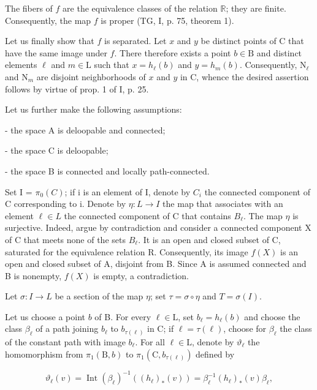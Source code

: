 The fibers of \(f\) are the equivalence classes of the relation \(\mathbb{R}\); they are finite. Consequently, the map \(f\) is proper (TG, I, p. 75, theorem 1).

Let us finally show that \(f\) is separated. Let \(x\) and \(y\) be distinct points of C that have the same image under \(f\). There therefore exists a point \(b \in \mathrm{B}\) and distinct elements \(\ell\) and \(m \in \mathrm{L}\) such that \(x = h_{\ell}(b)\) and \(y = h_{m}(b)\). Consequently, \(\mathrm{N}_{\ell}\) and \(\mathrm{N}_m\) are disjoint neighborhoods of \(x\) and \(y\) in C, whence the desired assertion follows by virtue of prop. 1 of I, p. 25.

Let us further make the following assumptions:

- the space A is deloopable and connected;

- the space C is deloopable;

- the space B is connected and locally path-connected.

Set I = \(\pi_{0}(C)\); if i is an element of I, denote by \(C_{i}\) the connected component of C corresponding to i. Denote by \(\eta: L \rightarrow I\) the map that associates with an element \(\ell \in L\) the connected component of C that contains \(B_{\ell}\). The map \(\eta\) is surjective. Indeed, argue by contradiction and consider a connected component X of C that meets none of the sets \(B_{\ell}\). It is an open and closed subset of C, saturated for the equivalence relation R. Consequently, its image \(f(X)\) is an open and closed subset of A, disjoint from B. Since A is assumed connected and B is nonempty, \(f(X)\) is empty, a contradiction.

Let \(\sigma\colon I\to L\) be a section of the map \(\eta\); set \(\tau=\sigma\circ\eta\) and \(T=\sigma(I)\).

Let us choose a point \(b\) of B. For every \(\ell \in \mathrm{L}\), set \(b_{\ell} = h_{\ell}(b)\) and choose the class \(\beta_{\ell}\) of a path joining \(b_{\ell}\) to \(b_{\tau(\ell)}\) in C; if \(\ell = \tau(\ell)\), choose for \(\beta_{\ell}\) the class of the constant path with image \(b_{\ell}\). For all \(\ell \in \mathrm{L}\), denote by \(\vartheta_{\ell}\) the homomorphism from \(\pi_1(\mathrm{B}, b)\) to \(\pi_1(\mathrm{C}, b_{\tau(\ell)})\) defined by

\[
\vartheta_ {\ell} (v) = \operatorname{Int} (\beta_ {\ell}) ^ {- 1} ((h _ {\ell}) _ {*} (v)) = \beta_ {\ell} ^ {- 1} (h _ {\ell}) _ {*} (v) \beta_ {\ell},
\]

